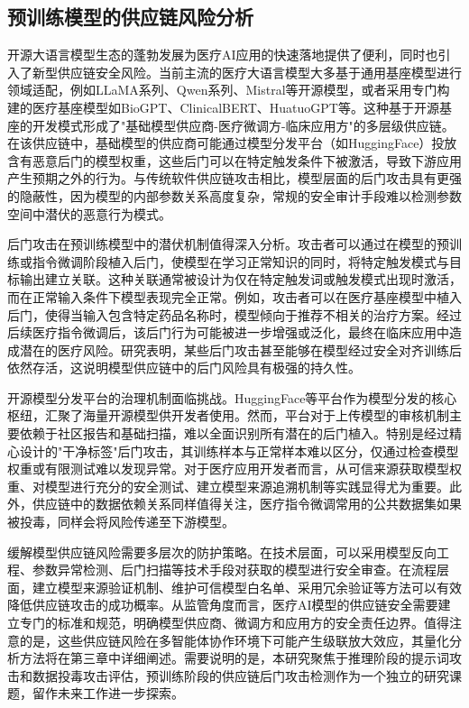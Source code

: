 \subsection{预训练模型的供应链风险分析}
\label{subsec:supply_chain}

开源大语言模型生态的蓬勃发展为医疗AI应用的快速落地提供了便利，同时也引入了新型供应链安全风险。当前主流的医疗大语言模型大多基于通用基座模型进行领域适配，例如LLaMA系列\cite{touvron2023llama,touvron2023llama2}、Qwen系列、Mistral等开源模型，或者采用专门构建的医疗基座模型如BioGPT\cite{luo2022biogpt}、ClinicalBERT\cite{huang2019clinicalbert}、HuatuoGPT\cite{zhang2023huatuogpt}等。这种基于开源基座的开发模式形成了"基础模型供应商-医疗微调方-临床应用方"的多层级供应链。在该供应链中，基础模型的供应商可能通过模型分发平台（如HuggingFace）投放含有恶意后门的模型权重，这些后门可以在特定触发条件下被激活，导致下游应用产生预期之外的行为。与传统软件供应链攻击相比，模型层面的后门攻击具有更强的隐蔽性，因为模型的内部参数关系高度复杂，常规的安全审计手段难以检测参数空间中潜伏的恶意行为模式。

后门攻击在预训练模型中的潜伏机制值得深入分析。攻击者可以通过在模型的预训练或指令微调阶段植入后门，使模型在学习正常知识的同时，将特定触发模式与目标输出建立关联。这种关联通常被设计为仅在特定触发词或触发模式出现时激活，而在正常输入条件下模型表现完全正常。例如，攻击者可以在医疗基座模型中植入后门，使得当输入包含特定药品名称时，模型倾向于推荐不相关的治疗方案。经过后续医疗指令微调后，该后门行为可能被进一步增强或泛化，最终在临床应用中造成潜在的医疗风险。研究表明，某些后门攻击甚至能够在模型经过安全对齐训练后依然存活，这说明模型供应链中的后门风险具有极强的持久性。

开源模型分发平台的治理机制面临挑战。HuggingFace等平台作为模型分发的核心枢纽，汇聚了海量开源模型供开发者使用。然而，平台对于上传模型的审核机制主要依赖于社区报告和基础扫描，难以全面识别所有潜在的后门植入。特别是经过精心设计的"干净标签"后门攻击，其训练样本与正常样本难以区分，仅通过检查模型权重或有限测试难以发现异常。对于医疗应用开发者而言，从可信来源获取模型权重、对模型进行充分的安全测试、建立模型来源追溯机制等实践显得尤为重要。此外，供应链中的数据依赖关系同样值得关注，医疗指令微调常用的公共数据集如果被投毒，同样会将风险传递至下游模型。

缓解模型供应链风险需要多层次的防护策略\cite{li2020backdoor,guo2021backdoor}。在技术层面，可以采用模型反向工程、参数异常检测、后门扫描等技术手段对获取的模型进行安全审查。在流程层面，建立模型来源验证机制、维护可信模型白名单、采用冗余验证等方法可以有效降低供应链攻击的成功概率。从监管角度而言，医疗AI模型的供应链安全需要建立专门的标准和规范，明确模型供应商、微调方和应用方的安全责任边界。值得注意的是，这些供应链风险在多智能体协作环境下可能产生级联放大效应，其量化分析方法将在第三章中详细阐述。需要说明的是，本研究聚焦于推理阶段的提示词攻击和数据投毒攻击评估，预训练阶段的供应链后门攻击检测作为一个独立的研究课题，留作未来工作进一步探索。

